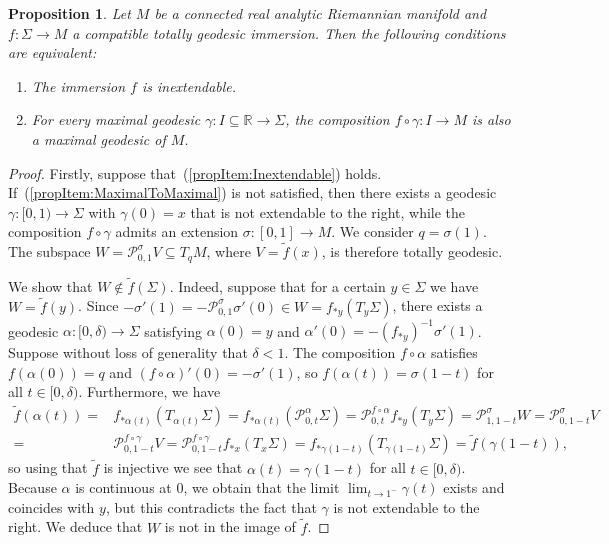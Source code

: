 \documentclass[11pt,a4paper,final]{amsart}
\newcommand{\R}{\mathbb{R}}
\renewcommand{\tilde}{\widetilde}
\newtheorem{proposition}[theorem]{Proposition}
\theoremstyle{definition}
\begin{document}
\begin{proposition}\label{prop:TGInextendableCharacterization}
	Let $M$ be a connected real analytic Riemannian manifold and $f\colon \Sigma \to M$ a compatible totally geodesic immersion.
	Then the following conditions are equivalent:
	\begin{enumerate}[\rm (i)]
		\item\label{propItem:Inextendable} The immersion $f$ is inextendable.
		\item\label{propItem:MaximalToMaximal} For every maximal geodesic $\gamma\colon I\subseteq \R \to \Sigma$, the composition $f\circ \gamma\colon I \to M$ is also a maximal geodesic of $M$.
	\end{enumerate}
\end{proposition}
\begin{proof}
	Firstly, suppose that~(\ref{propItem:Inextendable}) holds.
	If~(\ref{propItem:MaximalToMaximal}) is not satisfied, then there exists a geodesic $\gamma\colon [0,1)\to\Sigma$ with $\gamma(0)=x$ that is not extendable to the right, while the composition $f\circ\gamma$ admits an extension $\sigma\colon[0,1]\to M$.
	We consider $q=\sigma(1)$.
	The subspace $W=\mathcal{P}_{0,1}^{\sigma}V\subseteq T_{q}M$, where $V=\tilde{f}(x)$, is therefore totally geodesic.
	
	We show that $W\notin \tilde{f}(\Sigma)$.
	Indeed, suppose that for a certain $y\in \Sigma$ we have $W=\tilde{f}(y)$.
	Since $-\sigma'(1)=-\mathcal{P}_{0,1}^{\sigma}\sigma'(0)\in W=f_{*y}(T_{y}\Sigma)$, there exists a geodesic $\alpha\colon [0,\delta)\to \Sigma$ satisfying $\alpha(0)=y$ and $\alpha'(0)=-(f_{*y})^{-1}\sigma'(1)$.
	Suppose without loss of generality that $\delta < 1$.
	The composition $f\circ \alpha$ satisfies $f(\alpha(0))=q$ and $(f\circ \alpha)'(0)=-\sigma'(1)$, so $f(\alpha(t))=\sigma(1-t)$ for all $t \in [0,\delta)$.
	Furthermore, we have
	\[
	\begin{aligned}
		\tilde{f}(\alpha(t))={}&f_{*\alpha(t)}(T_{\alpha(t)}\Sigma)=f_{*\alpha(t)}(\mathcal{P}_{0,t}^{\alpha}\Sigma)=\mathcal{P}_{0,t}^{f\circ \alpha} f_{*y}(T_{y}\Sigma)=\mathcal{P}_{1,1-t}^{\sigma}W=\mathcal{P}_{0,1-t}^{\sigma}V \\
		={}&\mathcal{P}_{0,1-t}^{f\circ \gamma}V=\mathcal{P}_{0,1-t}^{f\circ\gamma}f_{*x}(T_{x}\Sigma)=f_{*\gamma(1-t)}(T_{\gamma(1-t)}\Sigma)=\tilde{f}(\gamma(1-t)),
	\end{aligned}
	\]
	so using that $\tilde{f}$ is injective we see that $\alpha(t)=\gamma(1-t)$ for all $t\in [0,\delta)$.
	Because $\alpha$ is continuous at $0$, we obtain that the limit $\lim_{t\to 1^{-}}\gamma(t)$ exists and coincides with $y$, but this contradicts the fact that $\gamma$ is not extendable to the right.
	We deduce that $W$ is not in the image of $\tilde{f}$.
	

\end{proof}
\end{document}
